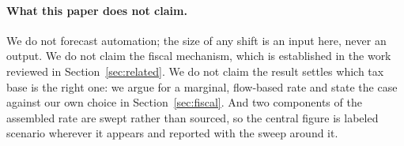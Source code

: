 \paragraph{What this paper does not claim.} We do not forecast automation; the size of any shift
is an input here, never an output. We do not claim the fiscal mechanism, which is established in
the work reviewed in Section~\ref{sec:related}. We do not claim the result settles which tax base
is the right one: we argue for a marginal, flow-based rate and state the case against our own
choice in Section~\ref{sec:fiscal}. And two components of the assembled rate are swept rather
than sourced, so the central figure is labeled scenario wherever it appears and reported with
the sweep around it.
